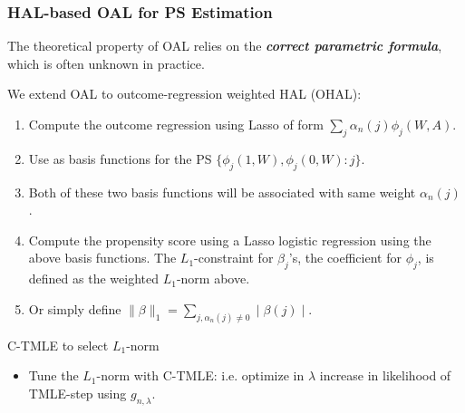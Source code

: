 \documentclass[t]{beamer}
\newlength{\wideitemsep}
\let\olditem\item
\renewcommand{\item}{\setlength{\itemsep}{\wideitemsep}\olditem}
\newcommand{\pl}{\parallel}
\begin{document}
\begin{frame}
\frametitle{HAL-based OAL for PS Estimation}

The theoretical property of OAL relies on the \textbf{\textit{correct parametric formula}}, which is often unknown in practice.

\vspace{.1in}

We extend OAL to outcome-regression weighted HAL (OHAL):
\begin{enumerate}
\item Compute the outcome regression using Lasso of form $\sum_j \alpha_n(j)\phi_j(W,A)$.
\item Use as basis functions for the PS $\{\phi_j(1,W),\phi_j(0,W): j\}$.
\item Both of these two basis functions will be associated with same weight $\alpha_n(j)$.
\item Compute the propensity score using a Lasso logistic regression using the above basis functions.  The $L_1$-constraint for $\beta_{j}$'s, the coefficient for $\phi_j$, is defined as the weighted $L_1$-norm above.
\item Or simply define $\pl \beta\pl_1=\sum_{j, \alpha_n(j)\not =0}\mid \beta(j)\mid$.
\end{enumerate}
\end{frame}
\begin{frame}{C-TMLE to select $L_1$-norm}
\begin{itemize}
  \item Tune the $L_1$-norm with C-TMLE: i.e. optimize in $\lambda$ increase in likelihood of TMLE-step using $g_{n,\lambda}$.
\end{itemize}
\end{frame}
\end{document}
